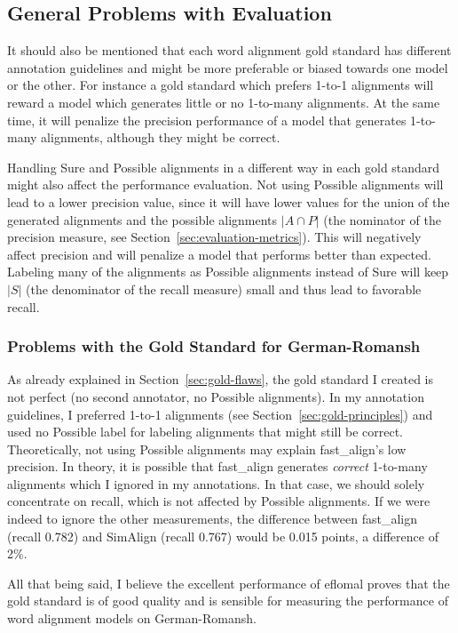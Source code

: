 \subsection{General Problems with Evaluation}
\label{sec:problems-evaluation}
It should also be mentioned that each word alignment gold standard has different annotation guidelines and might be more preferable or biased towards one model or the other. 
For instance a gold standard which prefers 1-to-1 alignments will reward a model which generates little or no 1-to-many alignments. 
At the same time, it will penalize the precision performance of a model that generates 1-to-many alignments, although they might be correct.

Handling Sure and Possible alignments in a different way in each gold standard might also affect the performance evaluation. 
Not using Possible alignments will lead to a lower precision value, since it will have lower values for the union of the generated alignments and the possible alignments $|A \cap P|$ (the nominator of the precision measure, see Section~\ref{sec:evaluation-metrics}). This will negatively affect precision and will penalize a model that performs better than expected. 
Labeling many of the alignments as Possible alignments instead of Sure will keep $|S|$ (the denominator of the recall measure) small and thus lead to favorable recall. 


\subsubsection{Problems with the Gold Standard for German-Romansh}
As already explained in Section~\ref{sec:gold-flaws}, the gold standard I created is not perfect (no second annotator, no Possible alignments). 
In my annotation guidelines, I preferred 1-to-1 alignments (see Section~\ref{sec:gold-principles}) and used no Possible label for labeling alignments that might still be correct.
Theoretically, not using Possible alignments may explain fast\_align's low precision. 
In theory, it is possible that fast\_align generates \emph{correct} 1-to-many alignments which I ignored in my annotations. 
In that case, we should solely concentrate on recall, which is not affected by Possible alignments. 
If we were indeed to ignore the other measurements, the difference between fast\_align (recall 0.782) and SimAlign (recall 0.767) would be 0.015 points, a difference of 2\%.

All that being said, I believe the excellent performance of eflomal proves that the gold standard is of good quality and is sensible for measuring the performance of word alignment models on German-Romansh.
 
